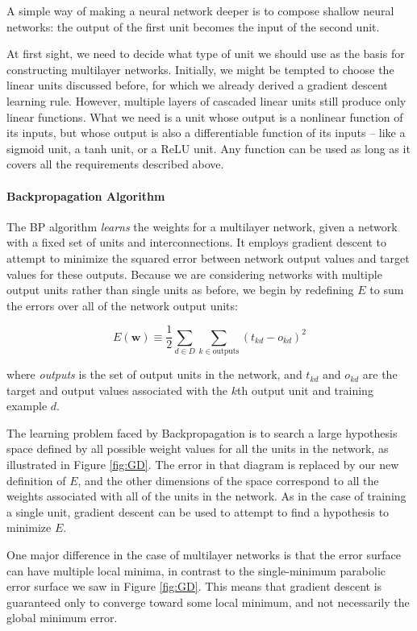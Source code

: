 \documentclass{tufte-handout}
\begin{document}
A simple way of making a neural network deeper is to compose shallow neural networks: the output of the first unit becomes the input of the second unit. 

At first sight, we need to decide what type of unit we should use as the basis for constructing multilayer networks. Initially, we might be tempted to choose the linear units discussed before, for which we already derived a gradient descent learning rule. However, multiple layers of cascaded linear units still produce only linear functions. What we need is a unit whose output is a nonlinear function of its inputs, but whose output is also a differentiable function of its inputs – like a sigmoid unit, a tanh unit, or a ReLU unit. Any function can be used as long as it covers all the requirements described above.

\paragraph{Backpropagation Algorithm}
The BP algorithm \textit{learns} the weights for a multilayer network, given a network with a fixed set of units and interconnections. It employs gradient descent to attempt to minimize the squared error between network output values and target values for these outputs.
Because we are considering networks with multiple output units rather than single units as before, we begin by redefining $E$ to sum the errors over all of the network output units:

\begin{equation}
    E(\mathbf{w}) \equiv \frac{1}{2} \sum_{d \in D} \sum_{k \in \text{outputs}} (t_{kd} - o_{kd})^2
\end{equation}

where \textit{outputs} is the set of output units in the network, and $t_{kd}$ and $o_{kd}$ are the target and output values associated with the $k$th output unit and training example $d$.

The learning problem faced by Backpropagation is to search a large hypothesis space defined by all possible weight values for all the units in the network, as illustrated in Figure \ref{fig:GD}. The error in that diagram is replaced by our new definition of $E$, and the other dimensions of the space correspond to all the weights associated with all of the units in the network. As in the case of training a single unit, gradient descent can be used to attempt to find a hypothesis to minimize $E$.

One major difference in the case of multilayer networks is that the error surface can have multiple local minima, in contrast to the single-minimum parabolic error surface we saw in Figure \ref{fig:GD}. This means that gradient descent is guaranteed only to converge toward some local minimum, and not necessarily the global minimum error.
\end{document}
